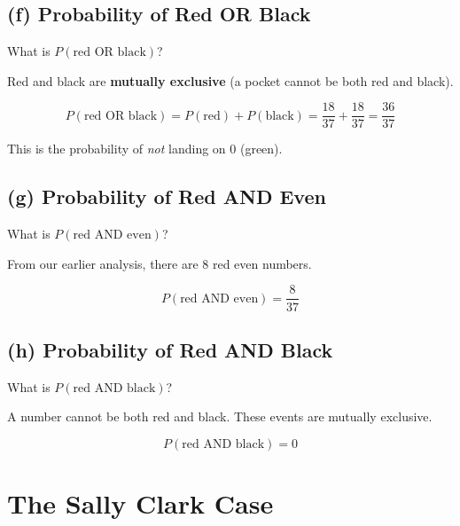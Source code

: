 \documentclass[11pt,a4paper]{article}
\begin{document}
\subsection*{(f) Probability of Red OR Black}

\begin{question}
What is $P(\text{red OR black})$?
\end{question}

\begin{answer}
Red and black are \textbf{mutually exclusive} (a pocket cannot be both red and black).

\[
P(\text{red OR black}) = P(\text{red}) + P(\text{black}) = \frac{18}{37} + \frac{18}{37} = \frac{36}{37}
\]

This is the probability of \textit{not} landing on 0 (green).
\end{answer}

\subsection*{(g) Probability of Red AND Even}

\begin{question}
What is $P(\text{red AND even})$?
\end{question}

\begin{answer}
From our earlier analysis, there are 8 red even numbers.

\[
P(\text{red AND even}) = \frac{8}{37}
\]
\end{answer}

\subsection*{(h) Probability of Red AND Black}

\begin{question}
What is $P(\text{red AND black})$?
\end{question}

\begin{answer}
A number cannot be both red and black. These events are mutually exclusive.

\[
P(\text{red AND black}) = 0
\]
\end{answer}

\newpage
\section{The Sally Clark Case}
\end{document}
